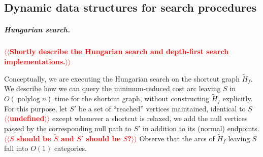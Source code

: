 \documentclass[a4paper,UKenglish]{socg-lipics-v2018}
\makeatletter
\def\note#1{\textcolor{red}{{#1}}}
\def\polylog{\mathop{\mathrm{polylog}}}
\def\eps{\varepsilon}
\DeclareMathOperator*{\argmin}{arg\,min}
\def\fsupply{\phi}
\theoremstyle{plain}
\numberwithin{figure}{section}
\renewcommand{\paragraph}{\subparagraph}
\def\EMPH#1{\textbf{\emph{\boldmath #1}}}
\def\n@te#1{\textsf{\boldmath \textbf{$\langle\!\langle$#1$\rangle\!\rangle$}}\leavevmode}
\def\note#1{\textcolor{red}{\n@te{#1}}}
\makeatother
\begin{document}
\subsection{Dynamic data structures for search procedures}

\paragraph{Hungarian search.}



\note{Shortly describe the Hungarian search and depth-first search implementations.}

Conceptually, we are executing the Hungarian search
on the shortcut graph $\tilde{H}_f$.
We describe how we can query the minimum-reduced cost arc leaving $S$ in
$O(\polylog n)$ time for the shortcut graph, without constructing
$\tilde{H}_f$ explicitly.
For this purpose, let \EMPH{$S'$} be a set of ``reached'' vertices maintained,
identical to $S$ \note{undefined} except whenever a shortcut is relaxed, we add the null vertices passed by the corresponding null path to $S'$ in addition to its (normal) endpoints. \note{$S$ should be $\tilde{S}$ and $S'$ should be $S$?}
%
Observe that the arcs of $\tilde{H}_f$ leaving $S$ fall into $O(1)$ categories.
\end{document}
